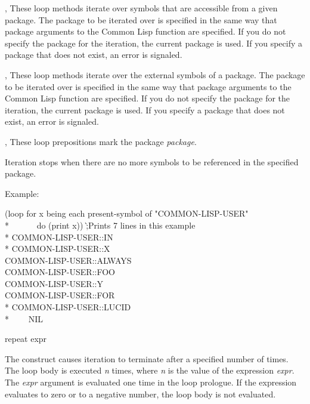 \begin{new}
\begin{defloop}
\begin{flushdesc}
\item[\cdf{symbol}, \cdf{symbols}]
These loop methods iterate over symbols that are
accessible from a given package.  The package to be iterated over is specified
in the same way that package arguments to the Common Lisp function
 are specified.  If you do not specify the package 
for the iteration, the current package is used.  If you specify a 
package that does not exist, an error is signaled.

\item[\cdf{external-symbol}, \cdf{external-symbols}]
These loop methods iterate over the external symbols of a package.
The package to be iterated over is specified in
the same way that package arguments to the Common Lisp function
 are specified.  If you do not specify the package 
for the iteration, the current package is used.  If you specify a 
package that does not exist, an error is signaled.

\item[\cdf{in}, \cdf{of}]
These loop prepositions mark the package {\it package}.
\end{flushdesc}

Iteration stops when there are no more symbols to be referenced in the
specified package.

Example:
\begin{lisp}
(loop for x being each present-symbol of "COMMON-LISP-USER"  \\*
~~~~~~do (print x)) \`;{\rm Prints 7 lines in this example}\\*
COMMON-LISP-USER::IN  \\*
COMMON-LISP-USER::X  \\
COMMON-LISP-USER::ALWAYS  \\
COMMON-LISP-USER::FOO  \\
COMMON-LISP-USER::Y  \\
COMMON-LISP-USER::FOR  \\*
COMMON-LISP-USER::LUCID  \\*
~~~\EV~NIL
\end{lisp}
\end{defloop}



\begin{defloop}
repeat expr

The  construct causes iteration to terminate after a
specified number of times.
The loop body is executed {\it n} times, where {\it n} is the value 
of the expression {\it expr}.  The {\it expr} argument is evaluated one time
in the loop prologue.  If the expression evaluates to zero or 
to a negative number, the loop body is not evaluated.



\end{defloop}
\end{new}
